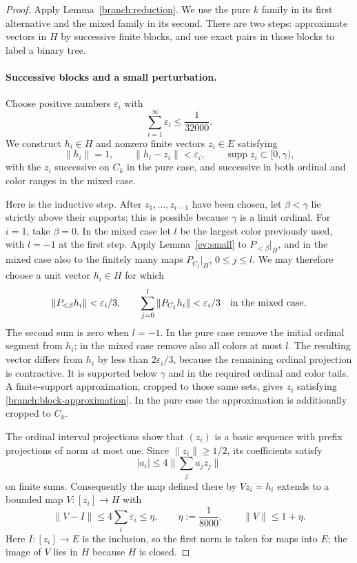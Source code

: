 \begin{proof}
Apply Lemma~\ref{branch:reduction}.  We use the pure $k$ family in its
first alternative and the mixed family in its second.  There are two
steps: approximate vectors in $H$ by successive finite blocks, and use
exact pairs in those blocks to label a binary tree.

\paragraph{Successive blocks and a small perturbation.}
Choose positive numbers $\varepsilon_i$ with
\[
           \sum_{i=1}^{\infty}\varepsilon_i\leq\frac1{32000}.
\]
We construct $h_i\in H$ and nonzero finite vectors $z_i\in E$ satisfying
\begin{equation}\label{branch:block-approximation}
 \|h_i\|=1,\qquad \|h_i-z_i\|<\varepsilon_i,
       \qquad \operatorname{supp}z_i\subset[0,\gamma),
\end{equation}
with the $z_i$ successive on $C_k$ in the pure case, and successive in
both ordinal and color ranges in the mixed case.

Here is the inductive step.  After $z_1,\ldots,z_{i-1}$ have been
chosen, let $\beta<\gamma$ lie strictly above their supports; this is
possible because $\gamma$ is a limit ordinal.  For $i=1$, take
$\beta=0$.  In the mixed case let $l$ be the largest color previously
used, with $l=-1$ at the first step.  Apply Lemma~\ref{ev:small} to
$P_{<\beta}|_H$, and in the mixed case also to the finitely many maps
$P_{C_j}|_H$, $0\leq j\leq l$.  We may therefore choose a unit vector
$h_i\in H$ for which
\[
 \|P_{<\beta}h_i\|<\varepsilon_i/3,
 \qquad
 \sum_{j=0}^{l}\|P_{C_j}h_i\|<\varepsilon_i/3
       \quad\hbox{in the mixed case}.
\]
The second sum is zero when $l=-1$.
In the pure case remove the initial ordinal segment from $h_i$; in the
mixed case remove also all colors at most $l$.  The resulting vector
differs from $h_i$ by less than $2\varepsilon_i/3$, because the
remaining ordinal projection is contractive.  It is supported below
$\gamma$ and in the required ordinal and color tails.  A finite-support
approximation, cropped to those same sets, gives $z_i$ satisfying
\eqref{branch:block-approximation}.  In the pure case the approximation
is additionally cropped to $C_k$.

The ordinal interval projections show that $(z_i)$ is a basic sequence
with prefix projections of norm at most one.  Since $\|z_i\|\geq1/2$,
its coefficients satisfy
\[
      |a_i|\leq4\Big\|\sum_j a_jz_j\Big\|
\]
on finite sums.  Consequently the map defined there by $Vz_i=h_i$
extends to a bounded map $V:[z_i]\to H$ with
\begin{equation}\label{branch:perturbation}
 \|V-I\|\leq4\sum_i\varepsilon_i\leq\eta,
          \qquad \eta:=\frac1{8000},
          \qquad \|V\|\leq1+\eta.
\end{equation}
Here $I:[z_i]\to E$ is the inclusion, so the first norm is taken for
maps into $E$; the image of $V$ lies in $H$ because $H$ is closed.


\end{proof}
